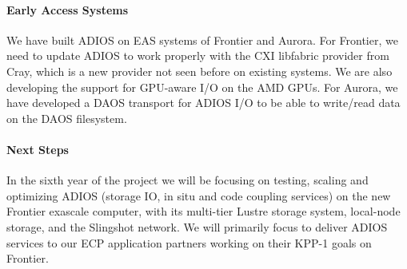\paragraph{Early Access Systems}

We have built ADIOS on EAS systems of Frontier and Aurora. For Frontier, we need to update ADIOS to work properly with the CXI libfabric provider from Cray, which is a new provider not seen before on existing systems. We are also developing the support for GPU-aware I/O on the AMD GPUs. For Aurora, we have developed a DAOS transport for ADIOS I/O to be able to write/read data on the DAOS filesystem. 

\paragraph{Next Steps}
In the sixth year of the project we will be focusing on testing, scaling and optimizing ADIOS (storage IO, in situ and code coupling services) on the new Frontier exascale computer, with its multi-tier Lustre storage system, local-node storage, and the Slingshot network. We will primarily focus to deliver ADIOS services to our ECP application partners working on their KPP-1 goals on Frontier. 
